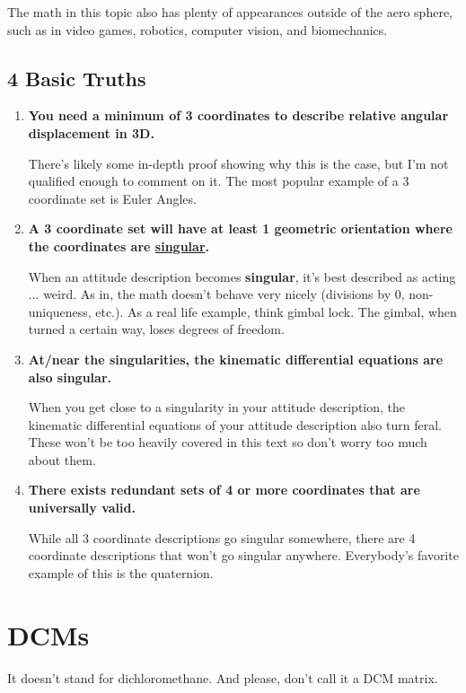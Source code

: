\documentclass[a4paper,14pt]{extreport}
\begin{document}
The math in this topic also has plenty of appearances outside of the aero sphere, such as in video games, robotics, computer vision, and biomechanics.

\section{4 Basic Truths}
\begin{enumerate}
\item \textbf{You need a minimum of 3 coordinates to describe relative angular displacement in 3D.} 

There's likely some in-depth proof showing why this is the case, but I'm not qualified enough to comment on it. The most popular example of a 3 coordinate set is Euler Angles.

\item \textbf{A 3 coordinate set will have at least 1 geometric orientation where the coordinates are \underline{singular}.} 

When an attitude description becomes \textbf{singular}, it's best described as acting ... weird. As in, the math doesn't behave very nicely (divisions by 0, non-uniqueness, etc.). As a real life example, think gimbal lock. The gimbal, when turned a certain way, loses degrees of freedom.

\item \textbf{At/near the singularities, the kinematic differential equations are also singular.} 

When you get close to a singularity in your attitude description, the kinematic differential equations of your attitude description also turn feral. These won't be too heavily covered in this text so don't worry too much about them.

\item \textbf{There exists redundant sets of 4 or more coordinates that are universally valid.}

While all 3 coordinate descriptions go singular somewhere, there are 4 coordinate descriptions that won't go singular anywhere. Everybody's favorite example of this is the quaternion.

\end{enumerate}
\chapter{DCMs}

It doesn't stand for dichloromethane. And please, don't call it a DCM matrix.
\end{document}
